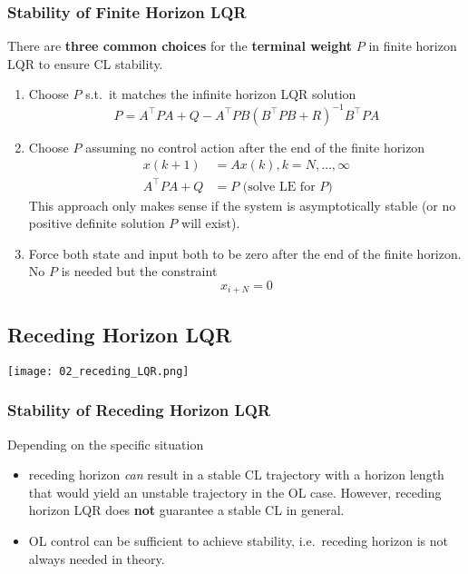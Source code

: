 \subsubsection{Stability of Finite Horizon LQR}

There are \textbf{three common choices} for the \textbf{terminal weight} $P$ in finite horizon LQR to ensure CL stability.
\begin{enumerate}
    \item Choose $P$ s.t.\ it matches the infinite horizon LQR solution
          \begin{equation*}
              P=A^\top PA+Q-A^\top PB{(B^\top PB+R)}^{-1}B^\top PA
          \end{equation*}
    \item Choose $P$ assuming no control action after the end of the finite horizon
          \begin{align*}
              x(k+1)        & =Ax(k),k=N,\dots ,\infty      \\
              A^{\top}PA +Q & = P\text{ (solve LE for $P$)}
          \end{align*}
          This approach only makes sense if the system is asymptotically stable (or no positive definite solution $P$ will exist).
    \item Force both state and input both to be zero after the end of the finite horizon. No $P$ is needed but the constraint
          \begin{equation*}
              x_{i+N} = 0
          \end{equation*}
\end{enumerate}

\subsection{Receding Horizon LQR}
\begin{center}
    \texttt{[image: 02\_receding\_LQR.png]}
\end{center}

\subsubsection{Stability of Receding Horizon LQR}

Depending on the specific situation
\begin{itemize}
    \item receding horizon \textit{can} result in a stable CL trajectory with a horizon length that would yield an unstable trajectory in the OL case. However, receding horizon LQR does \textbf{not} guarantee a stable CL in general.
    \item OL control can be sufficient to achieve stability, i.e.\ receding horizon is not always needed in theory.
\end{itemize}

